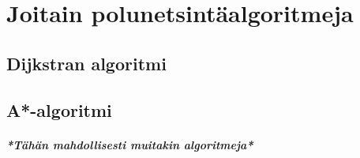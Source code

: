 \chapter{Joitain polunetsintäalgoritmeja} \label{joitainP}
\section{Dijkstran algoritmi}\label{dijkstra}
\section{A*-algoritmi}\label{aStar}

\paragraph{\textit{*Tähän mahdollisesti muitakin algoritmeja*}}
